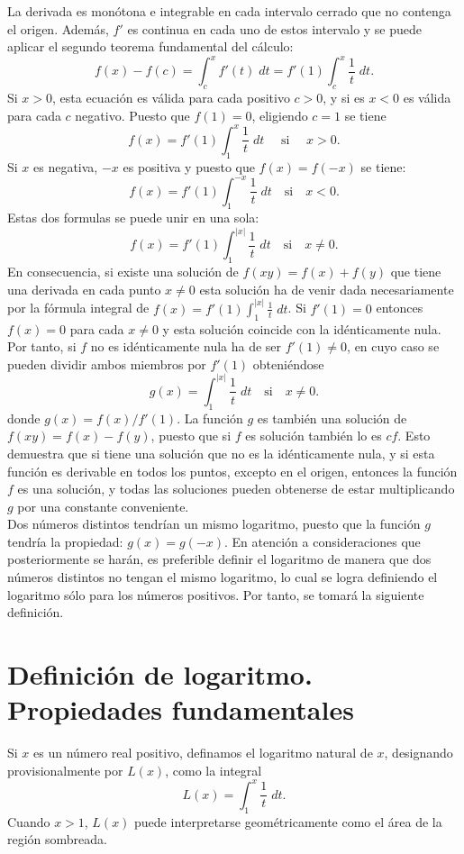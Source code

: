 La derivada es monótona e integrable en cada intervalo cerrado que no contenga el origen. Además, $f'$ es continua en cada uno de estos intervalo y se puede aplicar el segundo teorema fundamental del cálculo:
$$f(x)-f(c)=\int_c^x f'(t)\; dt = f'(1)\int_c^x \dfrac{1}{t}\; dt.$$
Si $x>0$, esta ecuación es válida para cada positivo $c>0$, y si es $x<0$ es válida para cada $c$ negativo. Puesto que $f(1)=0$, eligiendo $c=1$ se tiene
$$f(x)=f'(1)\int_1^x \dfrac{1}{t}\; dt\quad \mbox{ si } \quad x>0.$$
Si $x$ es negativa, $-x$ es positiva y puesto que $f(x)=f(-x)$ se tiene:
$$f(x)=f'(1)\int_1^{-x}\dfrac{1}{t}\; dt\quad \mbox{si}\quad x<0.$$
Estas dos formulas se puede unir en una sola:
$$f(x)=f'(1)\int_1^{|x|}\dfrac{1}{t}\; dt\quad \mbox{si}\quad x\neq 0.$$
En consecuencia, si existe una solución de $f(xy)=f(x)+f(y)$ que tiene una derivada en cada punto $x\neq 0$ esta solución ha de venir dada necesariamente por la fórmula integral de $f(x)=f'(1)\int_1^{|x|}\frac{1}{t}\; dt$. Si $f'(1)=0$ entonces $f(x)=0$ para cada $x\neq 0$ y esta solución coincide con la idénticamente nula. Por tanto, si $f$ no es idénticamente nula ha de ser $f'(1)\neq 0$, en cuyo caso se pueden dividir ambos miembros por $f'(1)$ obteniéndose
$$g(x)=\int_1^{|x|}\dfrac{1}{t}\; dt\quad \mbox{si}\quad x\neq 0.$$
donde $g(x)=f(x)/f'(1)$. La función $g$ es también una solución de $f(xy)=f(x)-f(y)$, puesto que si $f$ es solución también lo es $cf$. Esto demuestra que si tiene una solución que no es la idénticamente nula, y si esta función es derivable en todos los puntos, excepto en el origen, entonces la función $f$ es una solución, y todas las soluciones pueden obtenerse de estar multiplicando $g$ por una constante conveniente.\\

Dos números distintos tendrían un mismo logaritmo, puesto que la función $g$ tendría la propiedad: $g(x) = g( - x)$. En atención a consideraciones que posteriormente se harán, es preferible definir el logaritmo de manera que dos números distintos no tengan el  mismo logaritmo, lo cual se logra definiendo el logaritmo sólo para los números positivos. Por tanto, se tomará la siguiente definición.


\section{Definición de logaritmo. Propiedades fundamentales}

\begin{def.}
    Si $x$ es un número real positivo, definamos el logaritmo natural de $x$, designando provisionalmente por $L(x)$, como la integral
    $$L(x)=\int_1^{x}\dfrac{1}{t}\; dt.$$
    Cuando $x>1$, $L(x)$ puede interpretarse geométricamente como el área de la región sombreada.
\end{def.}

